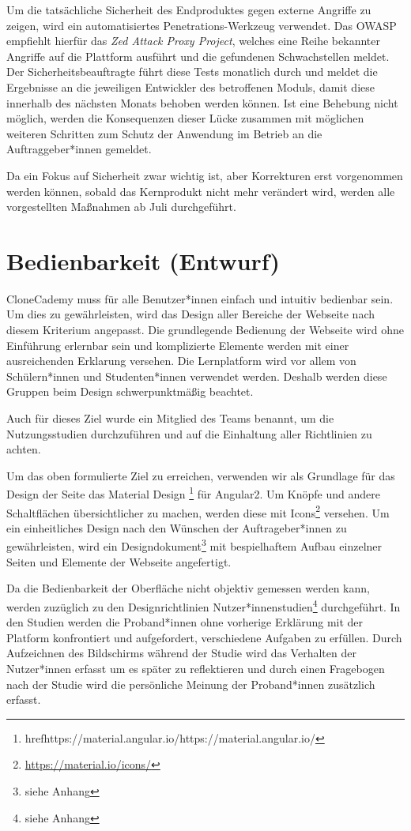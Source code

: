 \documentclass[accentcolor=tud0b,12pt,paper=a4]{tudreport}
\begin{document}
Um die tatsächliche Sicherheit des Endproduktes gegen externe Angriffe zu zeigen, wird ein automatisiertes Penetrations-Werkzeug verwendet. Das OWASP empfiehlt hierfür das \emph{Zed Attack Proxy Project}, welches eine Reihe bekannter Angriffe auf die Plattform ausführt und die gefundenen Schwachstellen meldet. Der Sicherheitsbeauftragte führt diese Tests monatlich durch und meldet die Ergebnisse an die jeweiligen Entwickler des betroffenen Moduls, damit diese innerhalb des nächsten Monats behoben werden können. Ist eine Behebung nicht möglich, werden die Konsequenzen dieser Lücke zusammen mit möglichen weiteren Schritten zum Schutz der Anwendung im Betrieb an die Auftraggeber*innen gemeldet.

Da ein Fokus auf Sicherheit zwar wichtig ist, aber Korrekturen erst vorgenommen werden können, sobald das Kernprodukt nicht mehr verändert wird, werden alle vorgestellten Maßnahmen ab Juli durchgeführt.

\section{Bedienbarkeit (Entwurf)}
CloneCademy muss für alle Benutzer*innen einfach und intuitiv bedienbar sein. Um dies zu gewährleisten, wird das Design aller Bereiche der Webseite nach diesem Kriterium angepasst. Die grundlegende Bedienung der Webseite wird ohne Einführung erlernbar sein und komplizierte Elemente werden mit einer ausreichenden Erklarung versehen. Die Lernplatform wird vor allem von Schülern*innen und Studenten*innen verwendet werden. Deshalb werden diese Gruppen beim Design schwerpunktmäßig beachtet.

Auch für dieses Ziel wurde ein Mitglied des Teams benannt, um die Nutzungsstudien durchzuführen und auf die Einhaltung aller Richtlinien zu achten.

Um das oben formulierte Ziel zu erreichen, verwenden wir als Grundlage für das Design der Seite das Material Design \footnote{href{https://material.angular.io/}{https://material.angular.io/}} für Angular2. Um Knöpfe und andere Schaltflächen übersichtlicher zu machen, werden diese mit Icons\footnote{\href{https://material.io/icons/}{https://material.io/icons/}} versehen. Um ein einheitliches Design nach den Wünschen der Auftrageber*innen zu gewährleisten, wird ein Designdokument\footnote{siehe Anhang} mit bespielhaftem Aufbau einzelner Seiten und Elemente der Webseite angefertigt.

Da die Bedienbarkeit der Oberfläche nicht objektiv gemessen werden kann, werden zuzüglich zu den Designrichtlinien Nutzer*innenstudien\footnote{siehe Anhang} durchgeführt. In den Studien werden die Proband*innen ohne vorherige Erklärung mit der Platform konfrontiert und aufgefordert, verschiedene Aufgaben zu erfüllen. Durch Aufzeichnen des Bildschirms während der Studie wird das Verhalten der Nutzer*innen erfasst um es später zu reflektieren und durch einen Fragebogen nach der Studie wird die persönliche Meinung der Proband*innen zusätzlich erfasst.
\end{document}
